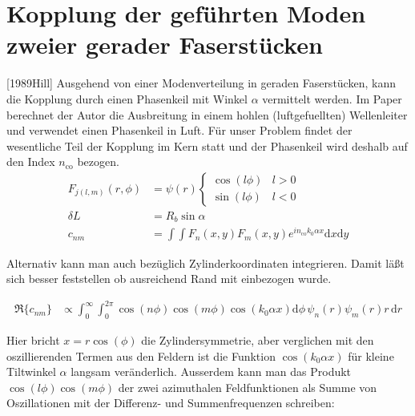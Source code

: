 \documentclass{article}
\newcommand{\nco}{n_\textrm{co}}
\begin{document}
\section{Kopplung der gef\"uhrten Moden zweier gerader Faserst\"ucken}
[1989Hill]
Ausgehend von einer Modenverteilung in geraden Faserst\"ucken, kann
die Kopplung durch einen Phasenkeil mit Winkel $\alpha$ vermittelt
werden. Im Paper berechnet der Autor die Ausbreitung in einem hohlen
(luftgefuellten) Wellenleiter und verwendet einen Phasenkeil in
Luft. F\"ur unser Problem findet der wesentliche Teil der Kopplung im
Kern statt und der Phasenkeil wird deshalb auf den Index $\nco$
bezogen.
\begin{align}
  F_{j(l,m)}(r,\phi) &= \psi(r) 
  \begin{cases}
    \cos(l \phi) & l>0\\  
    \sin(l \phi) & l<0
  \end{cases} \\
  \delta L &= R_b \sin\alpha\\
  c_{nm}&=\int\!\!\!\int\! F_n(x,y)F_m(x,y) e^{i\nco k_0\alpha x} \textrm{d}x \textrm{d}y
\end{align}

Alternativ kann man auch bez\"uglich Zylinderkoordinaten
integrieren. Damit l\"a\ss t sich besser feststellen ob ausreichend
Rand mit einbezogen wurde.

\begin{align}
  \Re\{c_{nm}\}&\propto\int_0^{\infty}\!\!\!\!\int_0^{2\pi}\!\!\!\!\!\! \cos(n\phi)\cos(m\phi) \cos(k_0\alpha x) \textrm{d}\phi\, \psi_n(r) \psi_m(r) r\, \textrm{d}r 
\end{align}

Hier bricht $x=r \cos(\phi)$ die Zylindersymmetrie, aber verglichen
mit den oszillierenden Termen aus den Feldern ist die Funktion
$\cos(k_0\alpha x)$ f\"ur kleine Tiltwinkel $\alpha$ langsam
ver\"anderlich. Ausserdem kann man das Produkt
$\cos(l\phi)\cos(m\phi)$ der zwei azimuthalen Feldfunktionen als Summe
von Oszillationen mit der Differenz- und Summenfrequenzen schreiben:


\end{document}
